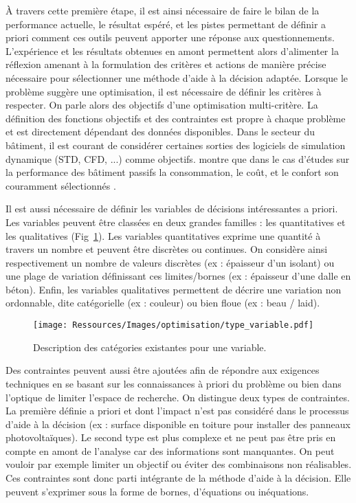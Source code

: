 À travers cette première étape, il est ainsi nécessaire de faire le bilan de la
performance actuelle, le résultat espéré, et les pistes permettant de définir a
priori comment ces outils peuvent apporter une réponse aux questionnements.
L’expérience et les résultats obtenues en amont permettent alors d’alimenter
la réflexion amenant à la formulation des critères et actions de manière précise
nécessaire pour sélectionner une méthode d’aide à la décision adaptée.
Lorsque le problème suggère une optimisation, il est nécessaire de définir les critères
à respecter. On parle alors des objectifs d’une optimisation multi-critère.
La définition des fonctions objectifs et des contraintes est propre à chaque problème
et est directement dépendant des données disponibles.
Dans le secteur du bâtiment, il est courant de considérer certaines sorties des
logiciels de simulation dynamique (STD, CFD, ...) comme objectifs.
 montre que dans le cas d’études sur la
performance des bâtiment passifs la consommation, le coût, et le confort son
couramment sélectionnés .

Il est aussi nécessaire de définir les variables de décisions intéressantes a priori.
Les variables peuvent être classées en deux grandes familles : les quantitatives et
les qualitatives (Fig~\ref{fig:type_variable}).
Les variables quantitatives exprime une quantité à travers un nombre et
peuvent être discrètes ou continues. On considère ainsi respectivement un nombre de
valeurs discrètes (ex : épaisseur d’un isolant) ou une plage de variation définissant
ces limites/bornes (ex : épaisseur d’une dalle en béton).
Enfin, les variables qualitatives permettent de décrire une variation non ordonnable,
dite catégorielle (ex : couleur) ou bien floue (ex : beau / laid).

\begin{figure}
    \begin{center}
        \texttt{[image: Ressources/Images/optimisation/type\_variable.pdf]}
    \end{center}
    \caption{Description des catégories existantes pour une variable.
             \label{fig:type_variable}}
\end{figure}

Des contraintes peuvent aussi être ajoutées afin de répondre aux exigences
techniques en se basant sur les connaissances à priori du problème ou bien dans
l’optique de limiter l’espace de recherche. On distingue deux types de contraintes.
La première définie a priori et dont l’impact n’est pas considéré dans le processus
d’aide à la décision (ex : surface disponible en toiture pour installer des
panneaux photovoltaïques).
Le second type est plus complexe et ne peut pas être pris en compte en amont de
l’analyse car des informations sont manquantes. On peut vouloir par exemple limiter
un objectif ou éviter des combinaisons non réalisables. Ces contraintes sont donc
parti intégrante de la méthode d’aide à la décision.
Elle peuvent s’exprimer sous la forme de bornes, d’équations ou inéquations.

